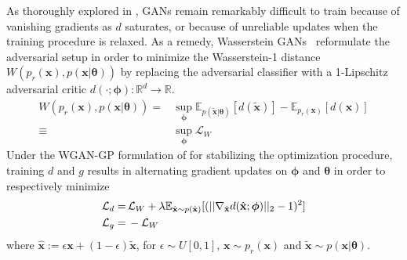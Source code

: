 \documentclass[twocolumn,superscriptaddress,aps]{revtex4-1}
\newcommand{\bftheta}{{\bm \theta}}
\newcommand{\bfphi}{{\bm \phi}}
\theoremstyle{plain}
\begin{document}
As thoroughly explored in \citep{2017arXiv170104862A}, GANs remain remarkably
difficult to train because of vanishing gradients as $d$ saturates, or because of
unreliable updates when the training procedure is relaxed. As a remedy,
Wasserstein GANs~\citep{2017arXiv170107875A} reformulate the adversarial
setup in order to minimize the Wasserstein-1 distance $W(p_r(\mathbf{x}), p(\mathbf{x}|\bftheta))$ by
replacing the adversarial classifier with a 1-Lipschitz adversarial critic
$d(\cdot; \bfphi) : \mathbb{R}^d \to \mathbb{R}$. 
\begin{align}
W( p_r(\mathbf{x} ), p(\mathbf{x} | \bftheta)  ) =& \sup_{\bfphi} \mathbb{E}_{p(\tilde{\mathbf{x}}|\bftheta)} [d(\tilde{\mathbf{x}})] - \mathbb{E}_{p_r(\mathbf{x})} [d(\mathbf{x})] \\
\equiv& \sup_{\bfphi} \mathcal{L}_W
\end{align}
Under the WGAN-GP formulation of \cite{2017arXiv170400028G}
for stabilizing the optimization procedure,
training $d$ and $g$ results in alternating gradient updates on $\bfphi$ and $\bftheta$ in order to respectively minimize
\begin{align}
    {\cal L}_d =\,&  \mathcal{L}_W + \lambda \mathbb{E}_{\hat{\mathbf{x}} \sim p({\hat{\mathbf{x}})}} [(|| \nabla_{\hat{\mathbf{x}}} d({\hat{\mathbf{x}}};\bfphi) ||_2 - 1)^2] \\
    {\cal L}_g =\,& - \mathcal{L}_W
\end{align}
%
where ${\hat{\mathbf{x}}} := \epsilon \mathbf{x} +
(1-\epsilon)\tilde{\mathbf{x}}$, for $\epsilon \sim U[0,1]$, $\mathbf{x} \sim
p_r(\mathbf{x})$ and $\tilde{\mathbf{x}} \sim p(\mathbf{x}|\bftheta)$.
\end{document}
